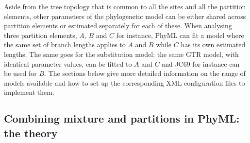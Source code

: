 \documentclass[a4paper,12pt]{article}
\begin{document}
Aside from the tree topology  that is common to all the sites and  all the partition elements, other
parameters of  the phylogenetic model  can be either shared  across partition elements  or estimated
separately  for each  of  these. When  analysing  three partition  elements, $A$,  $B$  and $C$  for
instance, PhyML can  fit a model where the same  set of branch lengths applies to  $A$ and $B$ while
$C$ has its  own estimated lengths.  The same  goes for the substitution model: the  same GTR model,
with identical parameter values, can be fitted to $A$  and $C$ and JC69 for instance can be used for
$B$. The sections below  give more detailed information on the range of  models available and how to
set up the corresponding XML configuration files to implement them.


\subsection{Combining mixture and partitions in PhyML: the  theory}
\end{document}
